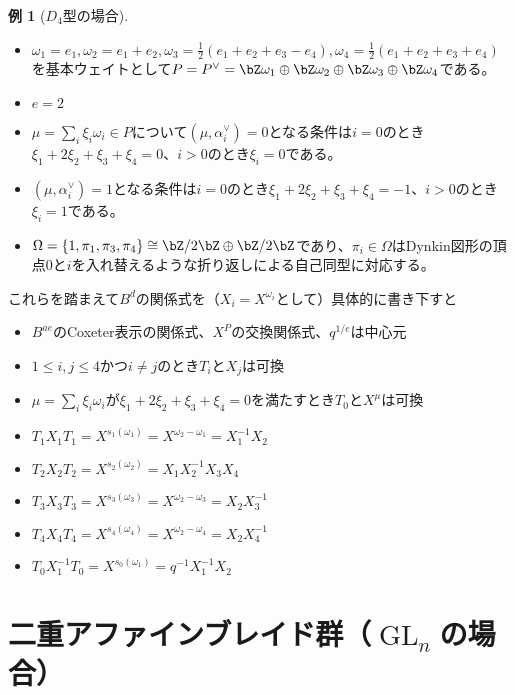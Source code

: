 \documentclass[uplatex, a4paper, dvipdfmx]{jsarticle}
\theoremstyle{definition}
\newtheorem{example}[theorem]{例}
\DeclareMathOperator{\GL}{\mathrm{GL}}
\begin{document}
\begin{example}[$D_4$型の場合]
    \begin{itemize}
        \item $\omega_1 = e_1, \omega_2 = e_1 + e_2, \omega_3 = \frac{1}{2}(e_1 + e_2 + e_3 - e_4), \omega_4 = \frac{1}{2}(e_1 + e_2 + e_3 + e_4)$を基本ウェイトとして$P = P^\vee = \bZ \omega_1 \oplus \bZ \omega_2 \oplus \bZ \omega_3 \oplus \bZ \omega_4$である。
        \item $e = 2$
        \item $\mu = \sum_i \xi_i \omega_i \in P$について$(\mu, \alpha_i^\vee) = 0$となる条件は$i=0$のとき$\xi_1 + 2\xi_2 + \xi_3 + \xi_4 = 0$、$i > 0$のとき$\xi_i = 0$である。
        \item $(\mu, \alpha_i^\vee) = 1$となる条件は$i=0$のとき$\xi_1 + 2\xi_2 + \xi_3 + \xi_4 = -1$、$i > 0$のとき$\xi_i = 1$である。
        \item $\Omega = \{1, \pi_1, \pi_3, \pi_4\} \cong \bZ/2\bZ \oplus \bZ/2\bZ$であり、$\pi_i \in \Omega$はDynkin図形の頂点$0$と$i$を入れ替えるような折り返しによる自己同型に対応する。
    \end{itemize}
    これらを踏まえて$B^d$の関係式を（$X_i = X^{\omega_i}$として）具体的に書き下すと
    \begin{itemize}
        \item $B^{ae}$のCoxeter表示の関係式、$X^P$の交換関係式、$q^{1/e}$は中心元
        \item $1\leq i, j \leq 4$かつ$i \neq j$のとき$T_i$と$X_j$は可換
        \item $\mu = \sum_i \xi_i \omega_i$が$\xi_1 + 2\xi_2 + \xi_3 + \xi_4 = 0$を満たすとき$T_0$と$X^\mu$は可換
        \item $T_1X_1T_1 = X^{s_1(\omega_1)} = X^{\omega_2-\omega_1} = X_1^{-1}X_2$
        \item $T_2X_2T_2 = X^{s_2(\omega_2)} = X_1X_2^{-1}X_3X_4$
        \item $T_3X_3T_3 = X^{s_3(\omega_3)} = X^{\omega_2-\omega_3} = X_2X_3^{-1}$
        \item $T_4X_4T_4 = X^{s_4(\omega_4)} = X^{\omega_2-\omega_4} = X_2X_4^{-1}$
        \item $T_0X_1^{-1}T_0 = X^{s_0(\omega_1)} = q^{-1}X_1^{-1}X_2$
    \end{itemize}
\end{example}
\section{二重アファインブレイド群（$\GL_n$の場合）}
\end{document}
